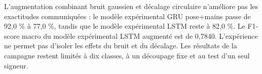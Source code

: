 L'augmentation combinant bruit gaussien et décalage circulaire n'améliore pas les exactitudes communiquées : le modèle expérimental GRU pose+mains passe de 92,0 \% à 77,0 \%, tandis que le modèle expérimental LSTM reste à 82,0 \%. Le F1-score macro du modèle expérimental LSTM augmenté est de 0,7840. L'expérience ne permet pas d'isoler les effets du bruit et du décalage. Les résultats de la campagne restent limités à dix classes, à un découpage fixe et au test d'un seul signeur.
